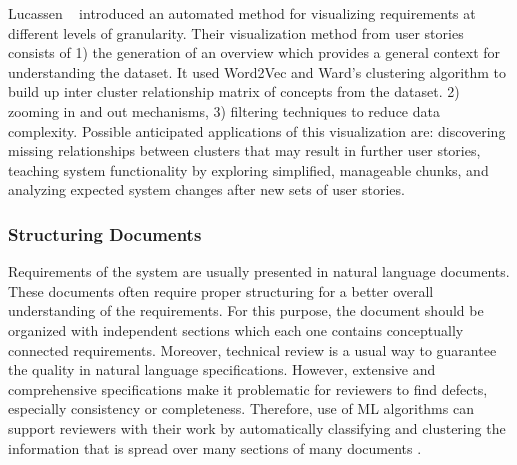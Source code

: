 Lucassen \etal~\cite{Lucassen:2016} introduced an automated method for
visualizing requirements at different levels of granularity. Their visualization method from
user stories consists of 1) the generation of an overview which provides a
general context for understanding the dataset. It used Word2Vec and Ward’s clustering algorithm to build up inter cluster relationship matrix of concepts from the dataset. 
2) zooming in and out mechanisms, 3) filtering techniques to reduce data
complexity. Possible anticipated applications of this
visualization are: discovering missing relationships between clusters that may
result in further user stories, teaching system functionality by exploring
simplified, manageable chunks, and analyzing expected system changes after
new sets of user stories.

\subsubsection{Structuring Documents} 

Requirements of the system are usually presented in natural language documents.
These documents often require proper structuring for a better overall
understanding of the requirements. For this purpose, the document should be
organized with independent sections which each one contains conceptually
connected requirements\cite{Ferrari:2013}. Moreover, technical review is a usual
way to guarantee the quality in natural language specifications. However,
extensive and comprehensive specifications make it problematic for reviewers to
find defects, especially consistency or completeness. Therefore, use of
ML algorithms can support reviewers with their work by
automatically classifying and clustering the information that is spread over
many sections of many documents \cite{Ott:2013}.


